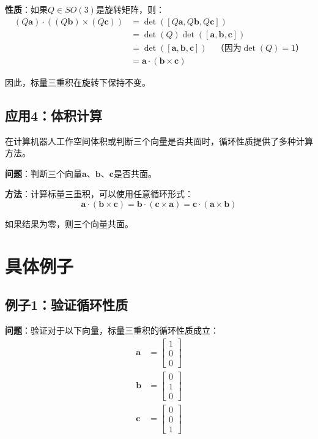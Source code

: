 \documentclass[12pt,a4paper]{article}
\begin{document}
\textbf{性质}：如果$Q \in SO(3)$是旋转矩阵，则：
\begin{align}
(Q\bm{a}) \cdot ((Q\bm{b}) \times (Q\bm{c})) &= \det([Q\bm{a}, Q\bm{b}, Q\bm{c}]) \\
&= \det(Q) \det([\bm{a}, \bm{b}, \bm{c}]) \\
&= \det([\bm{a}, \bm{b}, \bm{c}]) \quad \text{（因为$\det(Q) = 1$）} \\
&= \bm{a} \cdot (\bm{b} \times \bm{c})
\end{align}

因此，标量三重积在旋转下保持不变。

\subsection{应用4：体积计算}

在计算机器人工作空间体积或判断三个向量是否共面时，循环性质提供了多种计算方法。

\textbf{问题}：判断三个向量$\bm{a}$、$\bm{b}$、$\bm{c}$是否共面。

\textbf{方法}：计算标量三重积，可以使用任意循环形式：
\begin{equation}
\bm{a} \cdot (\bm{b} \times \bm{c}) = \bm{b} \cdot (\bm{c} \times \bm{a}) = \bm{c} \cdot (\bm{a} \times \bm{b})
\end{equation}

如果结果为零，则三个向量共面。

\section{具体例子}

\subsection{例子1：验证循环性质}

\textbf{问题}：验证对于以下向量，标量三重积的循环性质成立：
\begin{align}
\bm{a} &= \begin{bmatrix} 1 \\ 0 \\ 0 \end{bmatrix} \\
\bm{b} &= \begin{bmatrix} 0 \\ 1 \\ 0 \end{bmatrix} \\
\bm{c} &= \begin{bmatrix} 0 \\ 0 \\ 1 \end{bmatrix}
\end{align}
\end{document}
